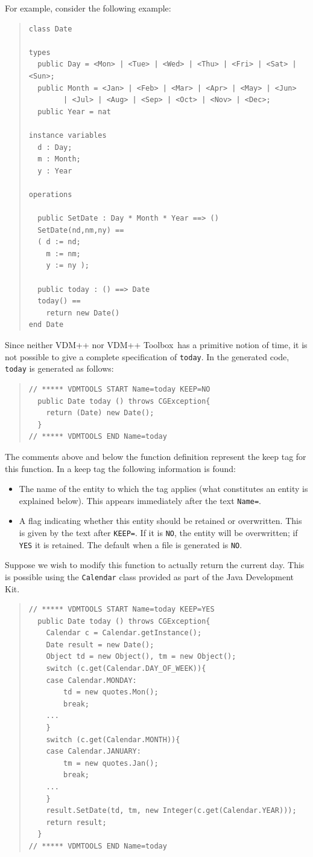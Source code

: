\documentclass[\pformat,11pt]{article}
\newcommand{\ToolboxName}{VDM++ Toolbox}
\begin{document}
For example, consider the following example:
\begin{quote}
\begin{verbatim}
class Date

types
  public Day = <Mon> | <Tue> | <Wed> | <Thu> | <Fri> | <Sat> | <Sun>;
  public Month = <Jan> | <Feb> | <Mar> | <Apr> | <May> | <Jun> 
        | <Jul> | <Aug> | <Sep> | <Oct> | <Nov> | <Dec>;
  public Year = nat

instance variables
  d : Day;
  m : Month;
  y : Year

operations

  public SetDate : Day * Month * Year ==> ()
  SetDate(nd,nm,ny) ==
  ( d := nd;
    m := nm;
    y := ny );

  public today : () ==> Date
  today() ==
    return new Date()
end Date
\end{verbatim}
\end{quote}
Since neither VDM++ nor \ToolboxName\ has a primitive notion of time,
it is not possible to give a complete specification of
\texttt{today}. In the generated code, \texttt{today} is generated as
follows: 
\begin{quote}
\begin{verbatim}
// ***** VDMTOOLS START Name=today KEEP=NO
  public Date today () throws CGException{
    return (Date) new Date();
  }
// ***** VDMTOOLS END Name=today
\end{verbatim}
\end{quote}
The comments above and below the function definition represent the keep
tag for this function. In a keep tag the following information is found:
\begin{itemize}
\item The name of the entity to which the tag applies (what constitutes
an entity is explained below). This appears immediately after the text
\texttt{Name=}. 
\item A flag indicating whether this entity should be retained or
overwritten. This is given by the text after \texttt{KEEP=}. If it is
\texttt{NO}, the entity will be overwritten; if \texttt{YES} it is
retained. The default when a file is generated is \texttt{NO}.
\end{itemize}
Suppose we wish to modify this function to actually return the current
day. This is possible using the \texttt{Calendar} class provided as
part of the Java Development Kit. 
\begin{quote}
\begin{verbatim}
// ***** VDMTOOLS START Name=today KEEP=YES
  public Date today () throws CGException{
    Calendar c = Calendar.getInstance();
    Date result = new Date();
    Object td = new Object(), tm = new Object();
    switch (c.get(Calendar.DAY_OF_WEEK)){
    case Calendar.MONDAY:
        td = new quotes.Mon();
        break;
    ...
    }
    switch (c.get(Calendar.MONTH)){
    case Calendar.JANUARY:
        tm = new quotes.Jan();
        break;
    ...
    }
    result.SetDate(td, tm, new Integer(c.get(Calendar.YEAR)));
    return result;
  }
// ***** VDMTOOLS END Name=today
\end{verbatim}
\end{quote}
\end{document}
